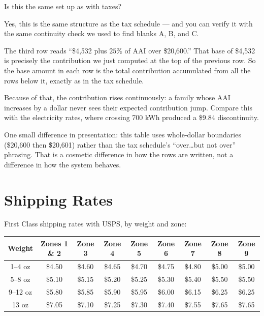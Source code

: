\documentclass[12pt]{ximera}
\begin{document}
\begin{problem}
Is this the same set up as with taxes?

\begin{multipleChoice}
\end{multipleChoice}

\begin{freeResponse}
\end{freeResponse}

\begin{solution}
Yes, this is the same structure as the tax schedule --- and you can verify it with the
same continuity check we used to find blanks A, B, and C.

The third row reads ``\$4,532 plus $25\%$ of AAI over \$20,600.'' That base of \$4,532 is
precisely the contribution we just computed at the top of the previous row. So the base
amount in each row is the total contribution accumulated from all the rows below it,
exactly as in the tax schedule.

Because of that, the contribution rises continuously: a family whose AAI increases by a
dollar never sees their expected contribution jump. Compare this with the electricity
rates, where crossing 700 kWh produced a \$9.84 discontinuity.

One small difference in presentation: this table uses whole-dollar boundaries (\$20,600
then \$20,601) rather than the tax schedule's ``over\ldots but not over'' phrasing.
That is a cosmetic difference in how the rows are written, not a difference in how the
system behaves.
\end{solution}
\end{problem}

\section*{Shipping Rates}

First Class shipping rates with USPS, by weight and zone:

\begin{center}
{\small\setlength{\tabcolsep}{3.5pt}
\begin{tabular}{|c|c|c|c|c|c|c|c|c|}
\hline
\textbf{Weight} & \textbf{Zones 1 \& 2} & \textbf{Zone 3} & \textbf{Zone 4} & \textbf{Zone 5}
& \textbf{Zone 6} & \textbf{Zone 7} & \textbf{Zone 8} & \textbf{Zone 9} \\
\hline
1--4 oz   & \$4.50 & \$4.60 & \$4.65 & \$4.70 & \$4.75 & \$4.80 & \$5.00 & \$5.00 \\
\hline
5--8 oz   & \$5.10 & \$5.15 & \$5.20 & \$5.25 & \$5.30 & \$5.40 & \$5.50 & \$5.50 \\
\hline
9--12 oz  & \$5.80 & \$5.85 & \$5.90 & \$5.95 & \$6.00 & \$6.15 & \$6.25 & \$6.25 \\
\hline
13 oz     & \$7.05 & \$7.10 & \$7.25 & \$7.30 & \$7.40 & \$7.55 & \$7.65 & \$7.65 \\
\hline
\end{tabular}}
\end{center}
\end{document}
